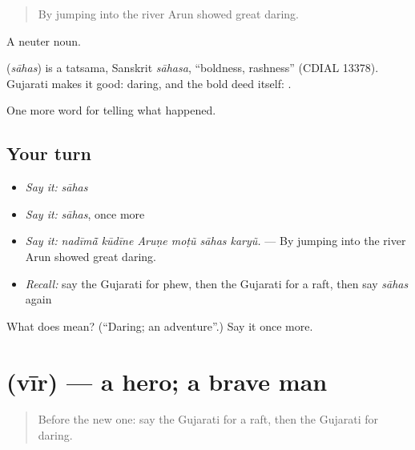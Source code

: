\begin{quote}
By jumping into the river Arun showed great daring.
\end{quote}

A neuter noun.

\begin{cousinweb}
\textbf{} (\emph{sāhas}) is a tatsama, Sanskrit \emph{sāhasa}, \textquotedblleft{}boldness, rashness\textquotedblright{} (CDIAL 13378). Gujarati makes it good: daring, and the bold deed itself: \textbf{ }.
\end{cousinweb}

\begin{grammarlens}[title={What you've built}]
One more word for telling what happened.
\end{grammarlens}

\subsection*{Your turn}
\begin{itemize}
\raggedright
  \item \emph{Say it:} \emph{sāhas}
  \item \emph{Say it:} \emph{sāhas}, once more
  \item \emph{Say it:} \emph{nadīmā̃ kūdīne Aruṇe moṭũ sāhas karyũ.} — By jumping into the river Arun showed great daring.
  \item \emph{Recall:} say the Gujarati for phew, then the Gujarati for a raft, then say \emph{sāhas} again
\end{itemize}

\begin{tcolorbox}[breakable,colback=teal!4,colframe=teal!35!black,title={Before you move on}]
What does  mean? (\textquotedblleft{}Daring; an adventure\textquotedblright{}.) Say it once more.
\end{tcolorbox}
\section[\texorpdfstring{\gu{વીર} (vīr)}{વીર (vīr)}]{ (vīr) — a hero; a brave man}

\label{lesson:GU-C308-vir}



\begin{quote}
Before the new one: say the Gujarati for a raft, then the Gujarati for daring.
\end{quote}

